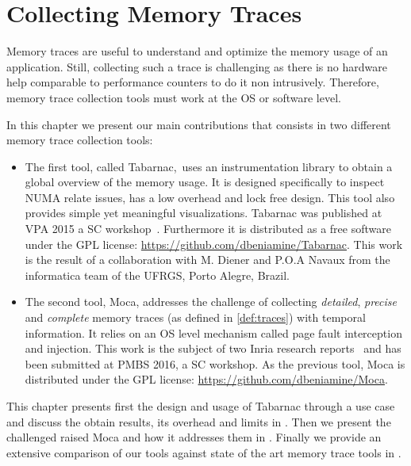 \chapter{Collecting Memory Traces}

Memory traces are useful to understand and optimize the memory usage of an application.
Still, collecting such a trace is challenging as there is no hardware help comparable to performance counters to do it non intrusively.
Therefore, memory trace collection tools must work at the \gls{OS} or software level.

In this chapter we present our main contributions that consists in two different memory trace collection tools:
\begin{itemize}
    \item The first tool, called \gls{Tabarnac}, uses an instrumentation library to obtain a global overview of the memory usage.
It is designed specifically to inspect \gls{NUMA} relate issues, has a low overhead and lock free design.
This tool also provides simple yet meaningful visualizations.
\gls{Tabarnac} was published at \gls{VPA} 2015 a \gls{SC} workshop~\cite{Beniamine15TABARNAC}.
Furthermore it is distributed as a free software under the \gls{GPL} license: \url{https://github.com/dbeniamine/Tabarnac}.
This work is the result of a collaboration with M. Diener and P.O.A Navaux from the informatica team of the \gls{UFRGS}, Porto Alegre, Brazil.
    \item The second tool, \gls{Moca}, addresses the challenge of collecting \emph{detailed}, \emph{precise} and \emph{complete} memory traces (as defined in \ref{def:traces}) with temporal information.
It relies on an \gls{OS} level mechanism called page fault interception and injection.
This work is the subject of two Inria research reports~\cite{Beniamine15Memory,Beniamine16Moca} and has been submitted at \gls{PMBS} 2016, a \gls{SC} workshop.
As the previous tool, \gls{Moca} is distributed under the \gls{GPL} license: \url{https://github.com/dbeniamine/Moca}.
\end{itemize}

This chapter presents first the design and usage of \gls{Tabarnac} through a use case and discuss the obtain results, its overhead and limits in .
Then we present the challenged raised \gls{Moca} and how it addresses them in .
Finally we provide an extensive comparison of our tools against state of the art memory trace tools in .


